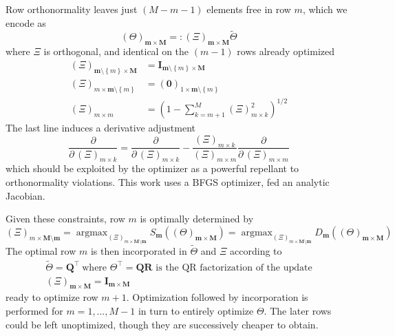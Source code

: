 \documentclass[preprint,12pt]{elsarticle}
\newcommand*{\M}[1]{\ensuremath{#1}\xspace}
\newcommand*{\vr}[1]{\M{\mathbf{#1}}}
\newcommand*{\deqr}{\M{=\mathrel{\mathop:}}}
\newcommand*{\set}[1]{\M{\left\lbrace#1\right\rbrace}}
\DeclareMathOperator*{\argmax}{argmax}
\begin{document}
            Row orthonormality leaves just $(M-m-1)$ elements free in row $m$, which we encode as
            \begin{equation} \label{eq:Method:BO:XiDef}
                (\Theta)_{\vr{m}\times\vr{M}} \deqr (\Xi)_{\vr{m}\times\vr{M}} \tilde{\Theta}
            \end{equation}
            where \(\Xi\) is orthogonal, and identical on the $(m-1)$ rows already optimized
            \begin{equation} \label{eq:Method:BO:XiConstraints}
                \begin{aligned}
                    (\Xi)_{\vr{m}\setminus\set{m}\times\vr{M}} &= \vr{I}_{\vr{m}\setminus\set{m}\times\vr{M}} \\
                    (\Xi)_{m\times\vr{m}\setminus\set{m}} &= (\vr{0})_{1\times\vr{m}\setminus\set{m}} \\
                    (\Xi)_{m\times m} &= \left(1 - \sum_{k=m+1}^{M} (\Xi)_{m\times k}^{2} \right)^{1/2}
                \end{aligned}            
            \end{equation}
            The last line induces a derivative adjustment
            \begin{equation} \label{eq:Method:BO:derivAdjust}
                \frac{\partial}{\partial\,(\Xi)_{m\times k}} = \frac{\partial}{\partial\,(\Xi)_{m\times k}} - 
                \frac{(\Xi)_{m \times k}}{(\Xi)_{m \times m}}\frac{\partial}{\partial\,(\Xi)_{m\times m}}
            \end{equation}
            which should be exploited by the optimizer as a powerful repellant to orthonormality violations.
            This work uses a BFGS optimizer, fed an analytic Jacobian.

            Given these constraints, row $m$ is optimally determined by
            \begin{equation} \label{eq:Method:BO:OptimalRow}
                (\Xi)_{m\times\vr{M}\setminus\vr{m}} = \argmax_{(\Xi)_{m\times\vr{M}\setminus\vr{m}}} S_{\vr{m}}((\Theta)_{\vr{m}\times\vr{M}}) = \argmax_{(\Xi)_{m\times\vr{M}\setminus\vr{m}}} D_{\vr{m}}((\Theta)_{\vr{m}\times\vr{M}})
            \end{equation}
            The optimal row $m$ is then incorporated in $\tilde{\Theta}$ and $\Xi$ according to
            \begin{equation} \label{eq:Method:BO:incorpUpadate}
                \begin{gathered}
                    \tilde{\Theta} = \vr{Q}^{\intercal} \  \text{where } \Theta^{\intercal} = \vr{Q}\vr{R} \text{ is the QR factorization of the update} \\
                    (\Xi)_{\vr{m}\times\vr{M}} = \vr{I}_{\vr{m}\times\vr{M}}
                \end{gathered}
            \end{equation}        
            ready to optimize row $m+1$. 
            Optimization followed by incorporation is performed for $m=1,\ldots, M-1$ in turn to entirely optimize $\Theta$.
            The later rows could be left unoptimized, though they are successively cheaper to obtain.
    
\end{document}
